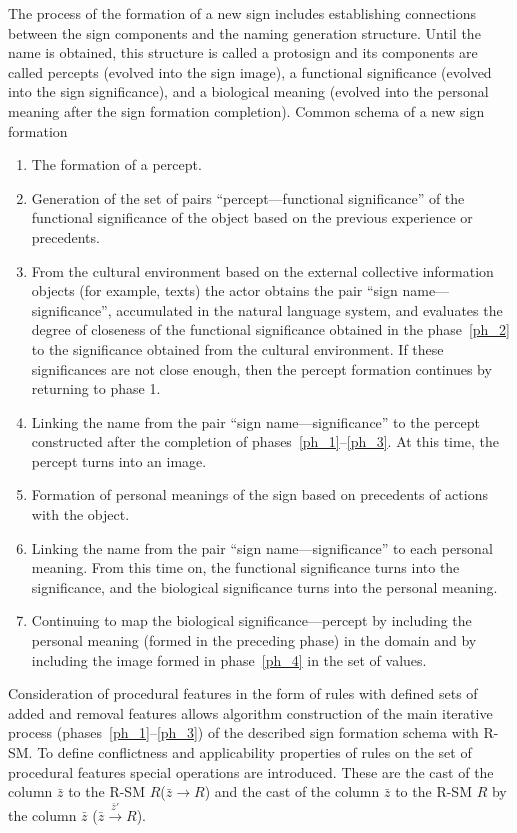 \documentclass[review]{elsarticle}
\begin{document}
The process of the formation of a new sign includes establishing connections between the sign components and the naming generation structure. Until the name is obtained, this structure is called a protosign and its components are called percepts (evolved into the sign image), a functional significance (evolved into the sign significance), and a biological meaning (evolved into the personal meaning after the sign formation completion). Common schema of a new sign formation \cite{Osipov2014}
\begin{enumerate}
	\item\label{ph_1} The formation of a percept.
	\item\label{ph_2} Generation of the set of pairs ``percept---functional significance'' of the functional significance of the object based on the previous experience or precedents.
	\item\label{ph_3} From the cultural environment based on the external collective information objects (for example, texts) the actor obtains the pair ``sign name---significance'', accumulated in the natural language system, and evaluates the degree of closeness of the functional significance obtained in the phase~\ref{ph_2} to the significance obtained from the cultural environment. If these significances are not close enough, then the percept formation continues by returning to phase 1.
	\item\label{ph_4} Linking the name from the pair ``sign name---significance'' to the percept constructed after the completion of phases~\ref{ph_1}--\ref{ph_3}. At this time, the percept turns into an image.
	\item\label{ph_5} Formation of personal meanings of the sign based on precedents of actions with the object.
	\item\label{ph_6} Linking the name from the pair ``sign name---significance'' to each personal meaning. From this time on, the functional significance turns into the significance, and the biological significance turns into the personal meaning.
	\item\label{ph_7} Continuing to map the biological significance---percept by including the personal meaning (formed in the preceding phase) in the domain and by including the image formed in phase~\ref{ph_4} in the set of values.
\end{enumerate}

Consideration of procedural features in the form of rules with defined sets of added and removal features allows algorithm construction of the main iterative process (phases~\ref{ph_1}--\ref{ph_3}) of the described sign formation schema with R-SM. To define conflictness and applicability properties of rules on the set of procedural features special operations are introduced. These are the cast of the column $\bar z$ to the R-SM $R$($\bar z \to R$) and the cast of the column $\bar z$ to the R-SM $R$ by the column $\bar z$ ($\bar z\mathop  \to \limits^{{{\bar z}'}} R$).
\end{document}
